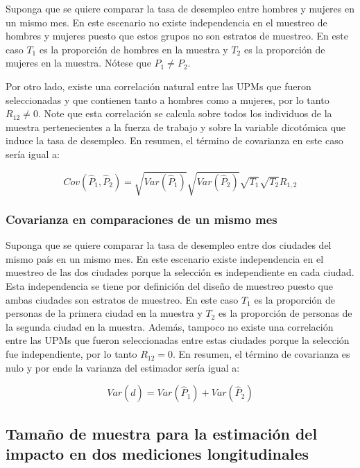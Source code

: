 \documentclass[
  10pt,
  spanish,
]{book}
\begin{document}
Suponga que se quiere comparar la tasa de desempleo entre hombres y mujeres en un mismo mes. En este escenario no existe independencia en el muestreo de hombres y mujeres puesto que estos grupos no son estratos de muestreo. En este caso \(T_1\) es la proporción de hombres en la muestra y \(T_2\) es la proporción de mujeres en la muestra. Nótese que \(P_1 \neq P_2\).

Por otro lado, existe una correlación natural entre las UPMs que fueron seleccionadas y que contienen tanto a hombres como a mujeres, por lo tanto \(R_{12} \neq 0\). Note que esta correlación se calcula sobre todos los individuos de la muestra pertenecientes a la fuerza de trabajo y sobre la variable dicotómica que induce la tasa de desempleo. En resumen, el término de covarianza en este caso sería igual a:

\[
Cov(\hat{P}_1, \hat{P}_2) = \sqrt{Var(\hat{P}_1)}\sqrt{Var(\hat{P}_2)}\sqrt{T_1}\sqrt{T_2}R_{1,2}
\]

\hypertarget{covarianza-en-comparaciones-de-un-mismo-mes-1}{%
\subsubsection*{Covarianza en comparaciones de un mismo mes}\label{covarianza-en-comparaciones-de-un-mismo-mes-1}}

Suponga que se quiere comparar la tasa de desempleo entre dos ciudades del mismo país en un mismo mes. En este escenario existe independencia en el muestreo de las dos ciudades porque la selección es independiente en cada ciudad. Esta independencia se tiene por definición del diseño de muestreo puesto que ambas ciudades son estratos de muestreo. En este caso \(T_1\) es la proporción de personas de la primera ciudad en la muestra y \(T_2\) es la proporción de personas de la segunda ciudad en la muestra. Además, tampoco no existe una correlación entre las UPMs que fueron seleccionadas entre estas ciudades porque la selección fue independiente, por lo tanto \(R_{12} = 0\). En resumen, el término de covarianza es nulo y por ende la varianza del estimador sería igual a:

\[
Var(\hat{d}) 
= Var(\hat{P}_1) + Var(\hat{P}_2)
\]

\hypertarget{tamauxf1o-de-muestra-para-la-estimaciuxf3n-del-impacto-en-dos-mediciones-longitudinales}{%
\subsection{Tamaño de muestra para la estimación del impacto en dos mediciones longitudinales}\label{tamauxf1o-de-muestra-para-la-estimaciuxf3n-del-impacto-en-dos-mediciones-longitudinales}}
\end{document}
